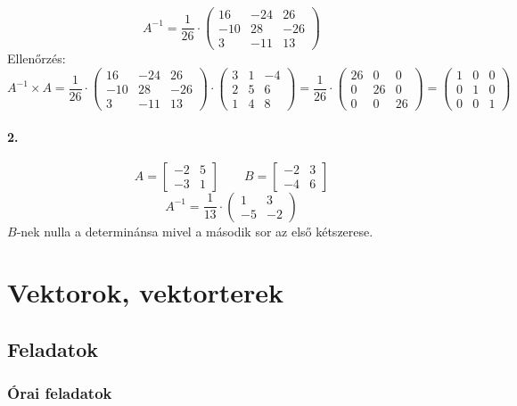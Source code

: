 \documentclass[12pt,a4paper,fleqn]{article}
\newcommand{\myparagraph}[1]{\paragraph{#1}\mbox{}}
\begin{document}
\[
  A^{-1} = \dfrac{1}{26} \cdot
  \begin{pmatrix}
    16 & -24 & 26 \\
    -10 & 28 & -26 \\
    3 & -11 & 13
  \end{pmatrix}
\]
Ellenőrzés:
\[
  A^{-1} \times A =
  \dfrac{1}{26} \cdot
  \begin{pmatrix}
    16 & -24 & 26 \\
    -10 & 28 & -26 \\
    3 & -11 & 13
  \end{pmatrix}
  \cdot
  \begin{pmatrix}
    3 & 1 & -4 \\
    2 & 5 & 6 \\
    1 & 4 & 8
  \end{pmatrix}
  =
  \dfrac{1}{26} \cdot
  \begin{pmatrix}
    26 & 0  & 0 \\
    0  & 26 & 0 \\
    0  & 0  & 26
  \end{pmatrix}
  =
  \begin{pmatrix}
    1 & 0  & 0 \\
    0  & 1 & 0 \\
    0  & 0  & 1
  \end{pmatrix}
\]


\myparagraph{2.}
\[
  A = \begin{bmatrix} -2 & 5 \\ -3 & 1 \end{bmatrix}
  \qquad
  B = \begin{bmatrix} -2 & 3 \\ -4 & 6 \end{bmatrix}
\]
\[
  A^{-1} = \dfrac{1}{13} \cdot \begin{pmatrix} 1 & 3 \\ -5 & -2 \end{pmatrix}
\]
$B$-nek nulla a determinánsa mivel a második sor az első kétszerese.

\clearpage
\section{Vektorok, vektorterek}
\setcounter{subsection}{1}
\subsection{Feladatok}
\subsubsection{Órai feladatok}
\end{document}
